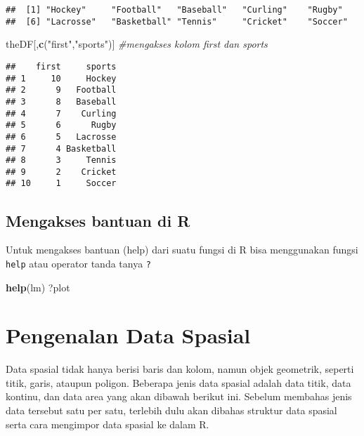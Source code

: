 \documentclass[
]{book}
\newenvironment{Shaded}{\begin{snugshade}}{\end{snugshade}}
\newcommand{\CommentTok}[1]{\textcolor[rgb]{0.56,0.35,0.01}{\textit{#1}}}
\newcommand{\KeywordTok}[1]{\textcolor[rgb]{0.13,0.29,0.53}{\textbf{#1}}}
\newcommand{\NormalTok}[1]{#1}
\newcommand{\StringTok}[1]{\textcolor[rgb]{0.31,0.60,0.02}{#1}}
\begin{document}
\begin{verbatim}
##  [1] "Hockey"     "Football"   "Baseball"   "Curling"    "Rugby"     
##  [6] "Lacrosse"   "Basketball" "Tennis"     "Cricket"    "Soccer"
\end{verbatim}

\begin{Shaded}
\begin{Highlighting}[]
\NormalTok{theDF[,}\KeywordTok{c}\NormalTok{(}\StringTok{"first"}\NormalTok{,}\StringTok{"sports"}\NormalTok{)] }\CommentTok{\#mengakses kolom first dan sports}
\end{Highlighting}
\end{Shaded}

\begin{verbatim}
##    first     sports
## 1     10     Hockey
## 2      9   Football
## 3      8   Baseball
## 4      7    Curling
## 5      6      Rugby
## 6      5   Lacrosse
## 7      4 Basketball
## 8      3     Tennis
## 9      2    Cricket
## 10     1     Soccer
\end{verbatim}

\hypertarget{mengakses-bantuan-di-r}{%
\subsection{Mengakses bantuan di R}\label{mengakses-bantuan-di-r}}

Untuk mengakses bantuan (help) dari suatu fungsi di R bisa menggunakan fungsi \texttt{help} atau operator tanda tanya \texttt{?}

\begin{Shaded}
\begin{Highlighting}[]
\KeywordTok{help}\NormalTok{(lm)}
\NormalTok{?plot}
\end{Highlighting}
\end{Shaded}

\hypertarget{pengenalan-data-spasial}{%
\section{Pengenalan Data Spasial}\label{pengenalan-data-spasial}}

Data spasial tidak hanya berisi baris dan kolom, namun objek geometrik, seperti titik, garis, ataupun poligon. Beberapa jenis data spasial adalah data titik, data kontinu, dan data area yang akan dibawah berikut ini. Sebelum membahas jenis data tersebut satu per satu, terlebih dulu akan dibahas struktur data spasial serta cara mengimpor data spasial ke dalam R.
\end{document}

